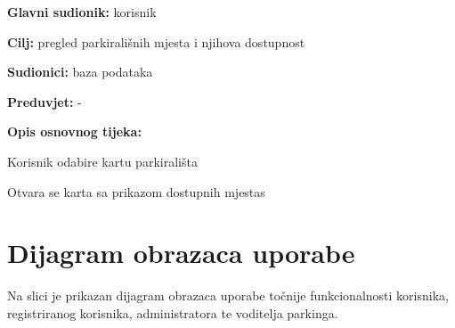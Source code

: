 					\noindent {}
					\begin{packed_item}
						
						\item \textbf{Glavni sudionik: }korisnik
						\item  \textbf{Cilj:} pregled parkirališnih mjesta i njihova dostupnost
						\item  \textbf{Sudionici:} baza podataka
						\item  \textbf{Preduvjet:} -
						\item  \textbf{Opis osnovnog tijeka:}
						
						\item[] \begin{packed_enum}
							
							\item  Korisnik odabire kartu parkirališta
							\item  Otvara se karta sa prikazom dostupnih mjestas
						\end{packed_enum}

					\end{packed_item}

				\section{Dijagram obrazaca uporabe} 
			
			{ Na slici je prikazan dijagram obrazaca uporabe točnije funkcionalnosti korisnika, registriranog korisnika, administratora te voditelja parkinga. }
				
			\begin{figure}[]
				\centering
				\label{fig:spotPicker}
			\end{figure}
			\pagebreak
					
